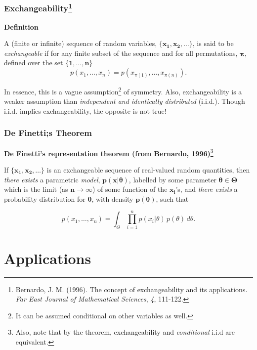 \documentclass{beamer}
\begin{document}
\begin{frame}
    \frametitle{Exchangeability\footnote{
        Bernardo, J. M. (1996).
        The concept of exchangeability and its applications.
        \emph{Far East Journal of Mathematical Sciences}, \emph{4}, 111-122.
    }}
    \textbf{Definition}

    \vfill

    A (finite or infinite) sequence of random variables, $\boldsymbol{\{x_1, x_2, \ldots\}}$,
    is said to be \emph{exchangeable} if for any finite subset of the sequence
    and for all permutations, $\boldsymbol{\pi}$, defined over the set $\boldsymbol{\{1, \ldots, n\}}$
    \[p(x_1, \ldots, x_n) = p(x_{\pi(1)}, \ldots, x_{\pi(n)}).\]

    \vfill

    In essence, this is a vague assumption\footnote{
    It can be assumed conditional on other variables as well.} of symmetry.
    Also, exchangeability is a weaker assumption than \emph{independent and identically distributed} (i.i.d.).
    Though i.i.d. implies exchangeability, the opposite is not true!
\end{frame}

\begin{frame}
    \frametitle{De Finetti;s Theorem}

    \vfill
    
    \textbf{De Finetti's representation theorem (from Bernardo, 1996)}\footnote{
    Also, note that by the theorem, exchangeability and \emph{conditional} i.i.d are equivalent.}

    \vfill

    If $\boldsymbol{\{x_1, x_2, \ldots\}}$ is an exchangeable sequence of real-valued random quantities,
    then \emph{there exists} a parametric \emph{model}, $\boldsymbol{p(x | \theta)}$, labelled by some
    parameter $\boldsymbol{\theta \in \Theta}$ which is the limit (as $\boldsymbol{n \to \infty}$)
    of some function of the $\boldsymbol{x_i}$'s, and \emph{there exists} a probability distribution
    for $\boldsymbol{\theta}$, with density $\boldsymbol{p(\theta)}$, such that

    \[p(x_1, \ldots, x_n) = \int_{\Theta} \prod_{i = 1}^{n} p(x_i | \theta) \, p(\theta) \, d\theta.\]
\end{frame}






\section{Applications}
\end{document}
